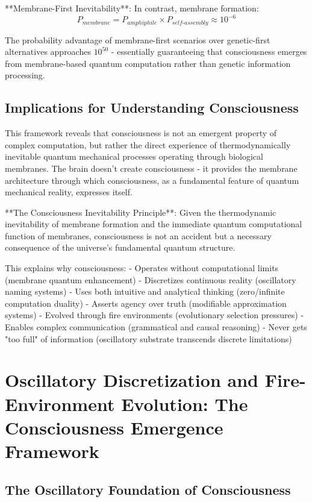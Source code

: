 \documentclass[12pt]{article}
\begin{document}
**Membrane-First Inevitability**: In contrast, membrane formation:
$$P_{membrane} = P_{amphiphile} \times P_{self\text{-}assembly} \approx 10^{-6}$$

The probability advantage of membrane-first scenarios over genetic-first alternatives approaches $10^{50}$ - essentially guaranteeing that consciousness emerges from membrane-based quantum computation rather than genetic information processing.

\subsection{Implications for Understanding Consciousness}

This framework reveals that consciousness is not an emergent property of complex computation, but rather the direct experience of thermodynamically inevitable quantum mechanical processes operating through biological membranes. The brain doesn't create consciousness - it provides the membrane architecture through which consciousness, as a fundamental feature of quantum mechanical reality, expresses itself.

**The Consciousness Inevitability Principle**: Given the thermodynamic inevitability of membrane formation and the immediate quantum computational function of membranes, consciousness is not an accident but a necessary consequence of the universe's fundamental quantum structure.

This explains why consciousness:
- Operates without computational limits (membrane quantum enhancement)
- Discretizes continuous reality (oscillatory naming systems)
- Uses both intuitive and analytical thinking (zero/infinite computation duality)
- Asserts agency over truth (modifiable approximation systems)
- Evolved through fire environments (evolutionary selection pressures)
- Enables complex communication (grammatical and causal reasoning)
- Never gets "too full" of information (oscillatory substrate transcends discrete limitations)

\section{Oscillatory Discretization and Fire-Environment Evolution: The Consciousness Emergence Framework}

\subsection{The Oscillatory Foundation of Consciousness}
\end{document}
